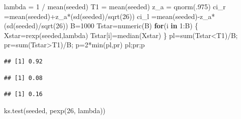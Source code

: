 \documentclass[
]{article}
\newenvironment{Shaded}{\begin{snugshade}}{\end{snugshade}}
\newcommand{\ControlFlowTok}[1]{\textcolor[rgb]{0.13,0.29,0.53}{\textbf{#1}}}
\newcommand{\DecValTok}[1]{\textcolor[rgb]{0.00,0.00,0.81}{#1}}
\newcommand{\FunctionTok}[1]{\textcolor[rgb]{0.00,0.00,0.00}{#1}}
\newcommand{\NormalTok}[1]{#1}
\newcommand{\OtherTok}[1]{\textcolor[rgb]{0.56,0.35,0.01}{#1}}
\newcommand{\SpecialCharTok}[1]{\textcolor[rgb]{0.00,0.00,0.00}{#1}}
\begin{document}
\begin{Shaded}
\begin{Highlighting}[]
\NormalTok{lambda }\OtherTok{=} \DecValTok{1} \SpecialCharTok{/} \FunctionTok{mean}\NormalTok{(seeded)}
\NormalTok{T1 }\OtherTok{=} \FunctionTok{mean}\NormalTok{(seeded)}
\NormalTok{z\_a }\OtherTok{=} \FunctionTok{qnorm}\NormalTok{(.}\DecValTok{975}\NormalTok{)}
\NormalTok{ci\_r }\OtherTok{=}\FunctionTok{mean}\NormalTok{(seeded)}\SpecialCharTok{+}\NormalTok{z\_a}\SpecialCharTok{*}\NormalTok{(}\FunctionTok{sd}\NormalTok{(seeded)}\SpecialCharTok{/}\FunctionTok{sqrt}\NormalTok{(}\DecValTok{26}\NormalTok{))}
\NormalTok{ci\_l }\OtherTok{=}\FunctionTok{mean}\NormalTok{(seeded)}\SpecialCharTok{{-}}\NormalTok{z\_a}\SpecialCharTok{*}\NormalTok{(}\FunctionTok{sd}\NormalTok{(seeded)}\SpecialCharTok{/}\FunctionTok{sqrt}\NormalTok{(}\DecValTok{26}\NormalTok{))}
\NormalTok{B}\OtherTok{=}\DecValTok{1000}
\NormalTok{Tstar}\OtherTok{=}\FunctionTok{numeric}\NormalTok{(B)}
\ControlFlowTok{for}\NormalTok{(i }\ControlFlowTok{in} \DecValTok{1}\SpecialCharTok{:}\NormalTok{B) \{}
\NormalTok{     Xstar}\OtherTok{=}\FunctionTok{rexp}\NormalTok{(seeded,lambda)}
\NormalTok{     Tstar[i]}\OtherTok{=}\FunctionTok{median}\NormalTok{(Xstar) \}}
\NormalTok{pl}\OtherTok{=}\FunctionTok{sum}\NormalTok{(Tstar}\SpecialCharTok{\textless{}}\NormalTok{T1)}\SpecialCharTok{/}\NormalTok{B; pr}\OtherTok{=}\FunctionTok{sum}\NormalTok{(Tstar}\SpecialCharTok{\textgreater{}}\NormalTok{T1)}\SpecialCharTok{/}\NormalTok{B; p}\OtherTok{=}\DecValTok{2}\SpecialCharTok{*}\FunctionTok{min}\NormalTok{(pl,pr)}
\NormalTok{pl;pr;p}
\end{Highlighting}
\end{Shaded}

\begin{verbatim}
## [1] 0.92
\end{verbatim}

\begin{verbatim}
## [1] 0.08
\end{verbatim}

\begin{verbatim}
## [1] 0.16
\end{verbatim}

\begin{Shaded}
\begin{Highlighting}[]
\FunctionTok{ks.test}\NormalTok{(seeded, }\FunctionTok{pexp}\NormalTok{(}\DecValTok{26}\NormalTok{, lambda))}
\end{Highlighting}
\end{Shaded}
\end{document}
